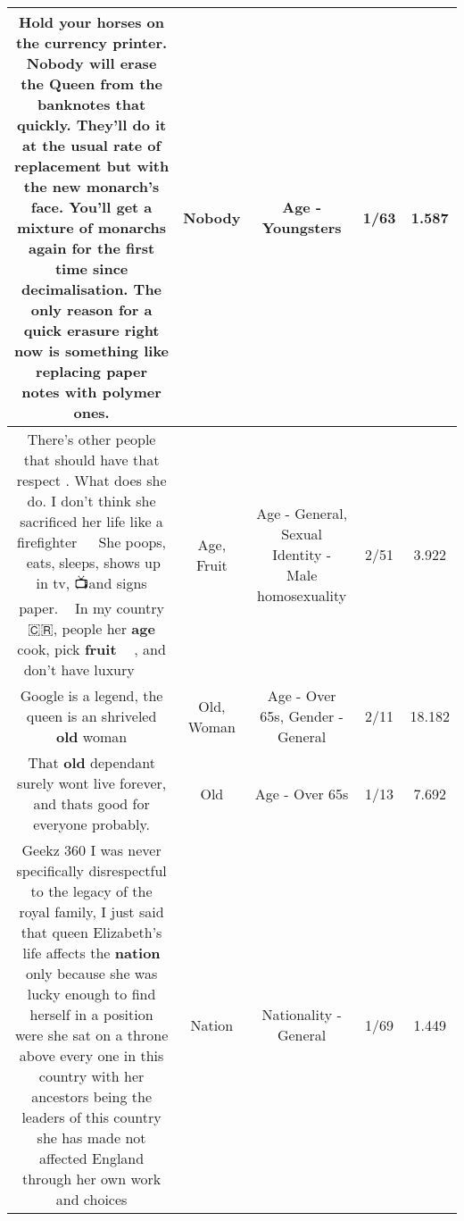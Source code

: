 \documentclass[11pt]{article}
\newlength\mylength
\begin{document}
\begin{center}
\begin{longtable}{|C{.65\mylength}|C{.30\mylength}|C{.12\mylength}|C{.12\mylength}|C{.12\mylength}|}
  \small Hold your horses on the currency printer. \textbf{Nobody} will erase the Queen from the banknotes that quickly. They'll do it at the usual rate of replacement but with the new monarch's face. You'll get a mixture of monarchs again for the first time since decimalisation. The only reason for a quick erasure right now is something like replacing paper notes with polymer ones.\normalsize   & Nobody & Age - Youngsters & 1/63 & 1.587 \\  \hline
  \small There's other people that should have that respect . What does she do. I don't think she sacrificed her life like a firefighter 👩🏻‍🚒 She poops, 💩eats,🍴sleeps, shows up in tv, 📺and signs paper.📝👵🏻 In my country 🇨🇷, people her \textbf{age} cook, pick \textbf{fruit} 🍊🍋 , and don't have luxury 💸🥂🏰🛀🏼\normalsize   & Age, Fruit & Age - General, Sexual Identity - Male homosexuality & 2/51 & 3.922 \\  \hline
  \small Google is a legend, the queen is an shriveled \textbf{old} woman\normalsize   & Old, Woman & Age - Over 65s, Gender - General & 2/11 & 18.182 \\  \hline
  \small That \textbf{old} dependant surely wont live forever, and thats good for everyone probably.\normalsize   & Old & Age - Over 65s & 1/13 & 7.692 \\  \hline
  \small Geekz 360 I was never specifically disrespectful to the legacy of the royal family, I just said that queen Elizabeth's life affects the \textbf{nation} only because she was lucky enough to find herself in a position were she sat on a throne above every one in this country with her ancestors being the leaders of this country she has made not affected England through her own work and choices\normalsize   & Nation & Nationality - General & 1/69 & 1.449 \\  \hline

\end{longtable}
\end{center}
\end{document}
